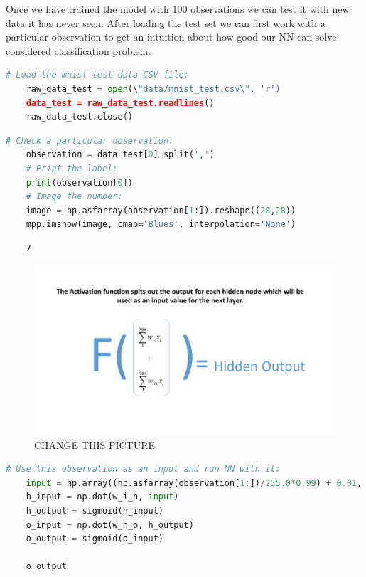 Once we have trained the model with 100 observations we can test it with new data it has never seen. After loading the test set we can first work with a particular observation to get an intuition about how good our NN can solve considered classification problem.

\begin{lstlisting}[language=Python]
    # Load the mnist test data CSV file:
    raw_data_test = open(\"data/mnist_test.csv\", 'r')
    data_test = raw_data_test.readlines()
    raw_data_test.close()
\end{lstlisting}

\begin{lstlisting}[language=Python]
    # Check a particular observation:
    observation = data_test[0].split(',')
    # Print the label:
    print(observation[0])
    # Image the number:
    image = np.asfarray(observation[1:]).reshape((28,28))
    mpp.imshow(image, cmap='Blues', interpolation='None')
\end{lstlisting}

\begin{lstlisting}
    7
\end{lstlisting}

\begin{figure}[H]
    \includegraphics[width=\linewidth]{pics/activation.jpg}
    \caption{\label{fig:bp} CHANGE THIS PICTURE}
\end{figure}

\begin{lstlisting}[language=Python]
    # Use this observation as an input and run NN with it:
    input = np.array((np.asfarray(observation[1:])/255.0*0.99) + 0.01, ndmin=2).T
    h_input = np.dot(w_i_h, input)
    h_output = sigmoid(h_input)
    o_input = np.dot(w_h_o, h_output)
    o_output = sigmoid(o_input)
    
    o_output
\end{lstlisting}

